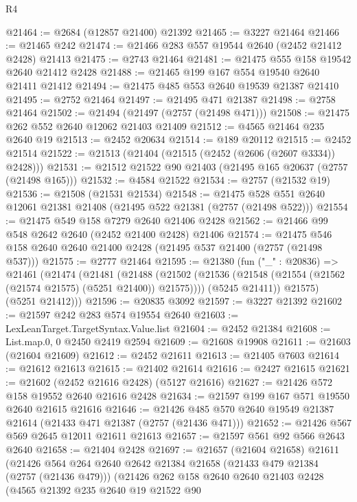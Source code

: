 \begin{lexlean}{R4}
\begin{coremodule}
@21464 := @2684 (@12857 @21400) @21392
@21465 := @3227 @21464
@21466 := @21465 @242
@21474 := @21466 @283 @557 @19544 @2640 (@2452 @21412 @2428) @21413
@21475 := @2743 @21464
@21481 := @21475 @555 @158 @19542 @2640 @21412 @2428
@21488 := @21465 @199 @167 @554 @19540 @2640 @21411 @21412
@21494 := @21475 @485 @553 @2640 @19539 @21387 @21410
@21495 := @2752 @21464
@21497 := @21495 @471 @21387
@21498 := @2758 @21464
@21502 := @21494 (@21497 (@2757 (@21498 @471)))
@21508 := @21475 @262 @552 @2640 @12062 @21403 @21409
@21512 := @4565 @21464 @235 @2640 @19
@21513 := @2452 @20634
@21514 := @189 @20112
@21515 := @2452 @21514
@21522 := @21513 (@21404 (@21515 (@2452 (@2606 (@2607 @3334)) @2428)))
@21531 := @21512 @21522 @90 @21403 (@21495 @165 @20637 (@2757 (@21498 @165)))
@21532 := @4584 @21522
@21534 := @2757 (@21532 @19)
@21536 := @21508 (@21531 @21534)
@21548 := @21475 @528 @551 @2640 @12061 @21381 @21408 (@21495 @522 @21381 (@2757 (@21498 @522)))
@21554 := @21475 @549 @158 @7279 @2640 @21406 @2428
@21562 := @21466 @99 @548 @2642 @2640 (@2452 @21400 @2428) @21406
@21574 := @21475 @546 @158 @2640 @2640 @21400 @2428 (@21495 @537 @21400 (@2757 (@21498 @537)))
@21575 := @2777 @21464
@21595 := @21380
    (fun ("_" : @20836) =>
    @21461
      (@21474
        (@21481
          (@21488
            (@21502 (@21536 (@21548 (@21554 (@21562 (@21574 @21575) (@5251 @21400)) @21575))))
            (@5245 @21411))
          @21575)
        (@5251 @21412)))
@21596 := @20835 @3092
@21597 := @3227 @21392
@21602 := @21597 @242 @283 @574 @19554 @2640
@21603 := LexLeanTarget.TargetSyntax.Value.list
@21604 := @2452 @21384
@21608 := List.map.{0, 0} @2450 @2419 @2594
@21609 := @21608 @19908
@21611 := @21603 (@21604 @21609)
@21612 := @2452 @21611
@21613 := @21405 @7603
@21614 := @21612 @21613
@21615 := @21402 @21614
@21616 := @2427 @21615
@21621 := @21602 (@2452 @21616 @2428) (@5127 @21616)
@21627 := @21426 @572 @158 @19552 @2640 @21616 @2428
@21634 := @21597 @199 @167 @571 @19550 @2640 @21615 @21616
@21646 := @21426 @485 @570 @2640 @19549 @21387 @21614 (@21433 @471 @21387 (@2757 (@21436 @471)))
@21652 := @21426 @567 @569 @2645 @12011 @21611 @21613
@21657 := @21597 @561 @92 @566 @2643 @2640
@21658 := @21404 @2428
@21697 := @21657
    (@21604 @21658)
    @21611
    (@21426
      @564
      @264
      @2640
      @2642
      @21384
      @21658
      (@21433 @479 @21384 (@2757 (@21436 @479)))
      (@21426
        @262
        @158
        @2640
        @2640
        @21403
        @2428
        (@4565
          @21392
          @235
          @2640
          @19
          @21522
          @90

\end{coremodule}
\end{lexlean}
